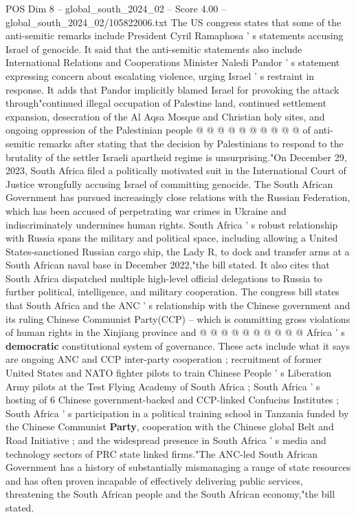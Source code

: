 \begin{textsample}{POS Dim 8 – global\_south\_2024\_02 – Score 4.00 – global\_south\_2024\_02/105822006.txt}
The US congress states that some of the anti-semitic remarks include President Cyril Ramaphosa ' s statements accusing Israel of genocide.
It said that the anti-semitic statements also include International Relations and Cooperations Minister Naledi Pandor ' s statement expressing concern about escalating violence, urging Israel ' s restraint in response.
It adds that Pandor implicitly blamed Israel for provoking the attack through"continued illegal occupation of Palestine land, continued settlement expansion, desecration of the Al Aqsa Mosque and Christian holy sites, and ongoing oppression of the Palestinian people @ @ @ @ @ @ @ @ @ @ of anti-semitic remarks after stating that the decision by Palestinians to respond to the brutality of the settler Israeli apartheid regime is unsurprising."On December 29, 2023, South Africa filed a politically motivated suit in the International Court of Justice wrongfully accusing Israel of committing genocide.
The South African Government has pursued increasingly close relations with the Russian Federation, which has been accused of perpetrating war crimes in Ukraine and indiscriminately undermines human rights.
South Africa ' s robust relationship with Russia spans the military and political space, including allowing a United States-sanctioned Russian cargo ship, the Lady R, to dock and transfer arms at a South African naval base in December 2022,"the bill stated.
It also cites that South Africa dispatched multiple high-level official delegations to Russia to further political, intelligence, and military cooperation.
The congress bill states that South Africa and the ANC ' s relationship with the Chinese government and its ruling Chinese Communist Party(CCP) -- which is committing gross violations of human rights in the Xinjiang province and @ @ @ @ @ @ @ @ @ @ Africa ' s \textbf{democratic} constitutional system of governance.
These acts include what it says are ongoing ANC and CCP inter-party cooperation ; recruitment of former United States and NATO fighter pilots to train Chinese People ' s Liberation Army pilots at the Test Flying Academy of South Africa ; South Africa ' s hosting of 6 Chinese government-backed and CCP-linked Confucius Institutes ; South Africa ' s participation in a political training school in Tanzania funded by the Chinese Communist \textbf{Party}, cooperation with the Chinese global Belt and Road Initiative ; and the widespread presence in South Africa ' s media and technology sectors of PRC state linked firms."The ANC-led South African Government has a history of substantially mismanaging a range of state resources and has often proven incapable of effectively delivering public services, threatening the South African people and the South African economy,"the bill stated.

\end{textsample}
